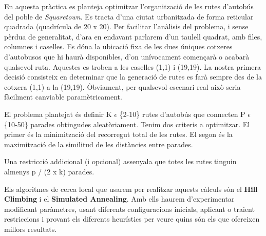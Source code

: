 En aquesta pràctica es planteja optimitzar l'organització de les rutes d'autobús del poble de \emph{Squaretown}. Es tracta d'una ciutat urbanitzada de forma reticular quadrada (quadrícula de 20 x 20). Per facilitar l'anàlisis del problema, i sense pèrdua de generalitat, d'ara en endavant parlarem d'un taulell quadrat, amb files, columnes i caselles. Es dóna la ubicació fixa de les dues úniques cotxeres d'autobusos que hi haurà disponibles, d'on unívocament començarà o acabarà qualsevol ruta. Aquestes es troben a les caselles (1,1) i (19,19). La nostra primera decisió consisteix en determinar que la generació de rutes es farà sempre des de la cotxera (1,1) a la (19,19). Òbviament, per qualsevol escenari real això seria fàcilment canviable paramètricament.

El problema plantejat és definir K $\epsilon$ \{2-10\} rutes d'autobús que connecten P $\epsilon$ \{10-50\} parades obtingudes aleatòriament. Tenim dos criteris a optimitzar. El primer és la minimització del recorregut total de les rutes. El segon és la maximització de la similitud de les distàncies entre parades.

Una restricció addicional (i opcional) assenyala que totes les rutes tinguin almenys p / (2 x k) parades.

Els algoritmes de cerca local que usarem per realitzar aquests càlculs són el \textbf{Hill Climbing} i el \textbf{Simulated Annealing}. Amb ells haurem d'experimentar modificant paràmetres, usant diferents configuracions inicials, aplicant o traient restriccions i provant els diferents heurístics per veure quins són els que ofereixen millors resultats.


% 
% 
% 
% 
% 
% 
% 

% 
% 

